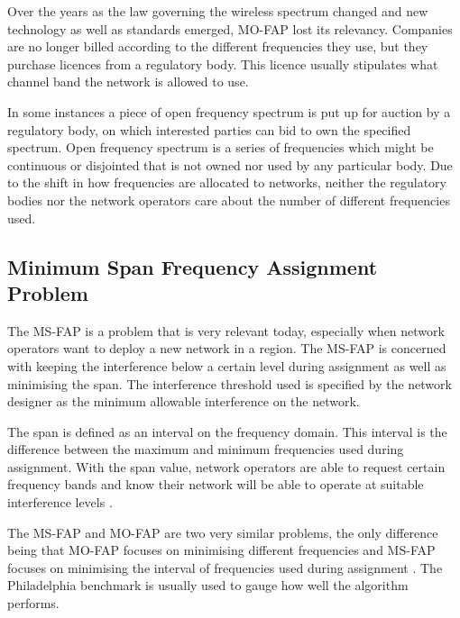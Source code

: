 Over the years as the law governing the wireless spectrum changed and new technology as well as standards emerged, \gls{MO-FAP} lost its relevancy\cite{Karen2004,MontemanniThesis}. Companies are no longer billed according to the different frequencies they use, but they purchase licences from a regulatory body\cite{Karen2004,MontemanniThesis}. This licence usually stipulates what channel band the network is allowed to use.

In some instances a piece of open frequency spectrum is put up for auction by a regulatory body, on which interested parties can bid to own the specified spectrum\cite{Karen2004,MontemanniThesis}. Open frequency spectrum is a series of frequencies which might be continuous or disjointed that is not owned nor used by any particular body. Due to the shift in how frequencies are allocated to networks, neither the regulatory bodies nor the network operators care about the number of different frequencies used\cite{Karen2004,MontemanniThesis}.
\subsection{Minimum Span Frequency Assignment Problem}
The \gls{MS-FAP} is a problem that is very relevant today, especially when network operators want to deploy a new network in a region\cite{Karen2004}. The \gls{MS-FAP} is concerned with keeping the interference below a certain level during assignment as well as minimising the span\cite{MSFAP}. The interference threshold used is specified by the network designer as the minimum allowable interference on the network\cite{MSFAP}.

The span is defined as an interval on the frequency domain. This interval is the difference between the maximum and minimum frequencies used during assignment\cite{Karen2004,MSFAP}. With the span value, network operators are able to request certain frequency bands and know their network will be able to operate at suitable interference levels \cite{Karen2004,MSFAP}.

The \gls{MS-FAP} and \gls{MO-FAP} are two very similar problems, the only difference being that \gls{MO-FAP} focuses on minimising different frequencies and \gls{MS-FAP} focuses on minimising the interval of frequencies used during assignment \cite{Karen2004}. The Philadelphia benchmark is usually used to gauge how well the algorithm performs.
